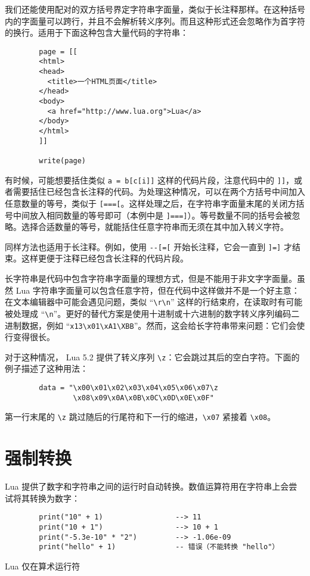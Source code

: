 {{我们还能使用配对的双方括号界定字符串字面量，类似于长注释那样。在这种括号内的字面量可以跨行，并且不会解析转义序列。而且这种形式还会忽略作为首字符的换行。适用于下面这种包含大量代码的字符串：

\begin{verbatim}
        page = [[
        <html>
        <head>
          <title>一个HTML页面</title>
        </head>
        <body>
          <a href="http://www.lua.org">Lua</a>
        </body>
        </html>
        ]]

        write(page)
\end{verbatim}

有时候，可能想要括住类似 \verb|a = b[c[i]]| 这样的代码片段，注意代码中的 \verb|]]|，或者需要括住已经包含长注释的代码。为处理这种情况，可以在两个方括号中间加入任意数量的等号，类似于 \verb|[===[|。这样处理之后，在字符串字面量末尾的关闭方括号中间放入相同数量的等号即可（本例中是 \verb|]===]|）。等号数量不同的括号会被忽略。选择合适数量的等号，就能括住任意字符串而无须在其中加入转义字符。

同样方法也适用于长注释。例如，使用 \verb|--[=[| 开始长注释，它会一直到 \verb|]=]| 才结束。这样更便于注释已经包含长注释的代码片段。

长字符串是代码中包含字符串字面量的理想方式，但是不能用于非文字字面量。虽然 Lua 字符串字面量可以包含任意字符，但在代码中这样做并不是一个好主意：在文本编辑器中可能会遇见问题，类似 ``\verb|\r\n|'' 这样的行结束府，在读取时有可能被处理成 ``\verb|\n|''。更好的替代方案是使用十进制或十六进制的数字转义序列编码二进制数据，例如 ``\verb|x13\x01\xA1\XBB|''。然而，这会给长字符串带来问题：它们会使行变得很长。

对于这种情况， Lua 5.2 提供了转义序列 \verb|\z|：它会跳过其后的空白字符。下面的例子描述了这种用法：
\begin{verbatim}
        data = "\x00\x01\x02\x03\x04\x05\x06\x07\z
                \x08\x09\x0A\x0B\x0C\x0D\x0E\x0F"
\end{verbatim}
第一行末尾的 \verb|\z| 跳过随后的行尾符和下一行的缩进，\verb|\x07| 紧接着 \verb|\x08|。

\section{强制转换}

Lua 提供了数字和字符串之间的运行时自动转换。数值运算符用在字符串上会尝试将其转换为数字：

\begin{verbatim}
        print("10" + 1)                 --> 11
        print("10 + 1")                 --> 10 + 1
        print("-5.3e-10" * "2")         --> -1.06e-09
        print("hello" + 1)              -- 错误（不能转换 "hello"）
\end{verbatim}
Lua 仅在算术运行符

}}
